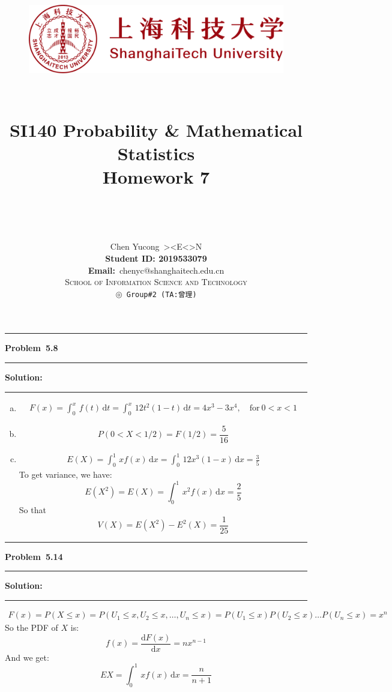 \documentclass[10.5pt]{article}
\title{
	\normalfont \normalsize
	\begin{figure}[!h]
	\centering
	\includegraphics[width=4.8in, keepaspectratio]{logo_red.pdf}\\[1cm]
	\end{figure}
	\horrule{0.5pt} \\[0.4cm]
	\Huge SI140 Probability \& Mathematical Statistics\\[0.4cm]
	\LARGE Homework 7\\
	\horrule{2pt} \\[1.5cm]
}
\author{\Song{\huge\textbf{陈昱聪}}\\[0.2cm]Chen Yucong\ ><E<>N\\[4.5cm]\textbf{Student ID: 2019533079}\\[0.2cm] 
\textbf{Email:}\ {\ttfamily chenyc@shanghaitech.edu.cn}\\[0.8cm] \LARGE\textsc{School of Information Science and Technology}\\[0.63cm]
\texttt{$\circledcirc$ Group\#2\ (TA:曾理)}}
\date{}
\newcommand\question[1]{\vspace{.2in}\hrule\vspace{0.04in}\textbf{Problem\ #1}\vspace{.4em}\hrule\vspace{.10in}}
\newcommand\Solution{\vspace{.3in}\textbf{Solution:}\vspace{.5em}\hrule\vspace{.08in}\par}
\begin{document}
	
\maketitle
\thispagestyle{firstpage}
\thispagestyle{empty}
\setcounter{page}{0}

\pagebreak

\question{5.8}
	\Solution{}
\begin{enumerate}[(a)]
	\item \begin{align*}
		F(x) = \int_{0}^x\,f(t)\,\mathrm{d}t=\int_{0}^x\,12t^2(1-t)\,\mathrm{d}t=4x^3-3x^4,\quad \text{for}\ 0<x<1
	\end{align*}
	\vspace{1cm}\item 
	$$P(0<X<1/2) = F(1/2) = \frac{5}{16}$$\vspace{1cm}\item 
	\begin{align*}
		E(X) = \int_{0}^1\,xf(x)\,\mathrm{d}x = \int_{0}^1\,12x^3(1-x)\,\mathrm{d}x=\frac{3}{5}
	\end{align*}
	To get variance, we have: $$E(X^2) = E(X) = \int_{0}^1\,x^2f(x)\,\mathrm{d}x = \frac{2}{5}$$
	So that $$V(X) = E(X^2) - E^2(X) = \frac{1}{25}$$
\end{enumerate}
   
\vspace{1cm}


\question{5.14}
	\Solution{}
	\begin{align*}
		F(x) = P(X\leqslant x) = P(U_1\leqslant x, U_2\leqslant x,\dots, U_n\leqslant x) = P(U_1\leqslant x)P(U_2\leqslant x)\dots P(U_n\leqslant x) = x^n
	\end{align*}
	So the PDF of $X$ is:
	$$f(x) = \frac{\mathrm{d} F(x)}{\mathrm{d} x} = nx^{n - 1}$$
	And we get:
	$$EX = \int_{0}^1\,xf(x)\,\mathrm{d}x = \frac{n}{n+1}$$


\pagebreak
\end{document}
